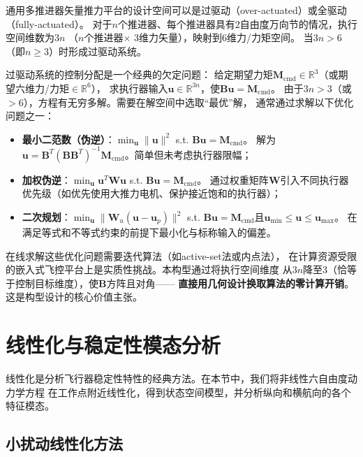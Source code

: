 \documentclass[a4paper,12pt]{ctexart}
\theoremstyle{plain}
\theoremstyle{definition}
\begin{document}
通用多推进器矢量推力平台的设计空间可以是过驱动（over-actuated）或全驱动（fully-actuated）。
对于$n$个推进器、每个推进器具有2自由度万向节的情况，执行空间维数为$3n$
（$n$个推进器$\times$ 3维力矢量），映射到6维力/力矩空间。
当$3n > 6$（即$n \ge 3$）时形成过驱动系统\cite{ding2018modeling}。

过驱动系统的控制分配是一个经典的欠定问题：
给定期望力矩$\bm{M}_{\text{cmd}} \in \mathbb{R}^3$（或期望六维力/力矩$\in \mathbb{R}^6$），
求执行器输入$\bm{u} \in \mathbb{R}^{3n}$，使$\bm{B}\bm{u} = \bm{M}_{\text{cmd}}$。
由于$3n > 3$（或$>6$），方程有无穷多解。需要在解空间中选取“最优”解，
通常通过求解以下优化问题之一\cite{johansen2013control}：
\begin{itemize}
    \item \textbf{最小二范数（伪逆）}：$\min_{\bm{u}} \|\bm{u}\|^2$ s.t. $\bm{B}\bm{u} = \bm{M}_{\text{cmd}}$。
          解为$\bm{u} = \bm{B}^T(\bm{B}\bm{B}^T)^{-1}\bm{M}_{\text{cmd}}$。简单但未考虑执行器限幅；
    \item \textbf{加权伪逆}：$\min_{\bm{u}} \bm{u}^T\bm{W}\bm{u}$ s.t. $\bm{B}\bm{u} = \bm{M}_{\text{cmd}}$。
          通过权重矩阵$\bm{W}$引入不同执行器优先级（如优先使用大推力电机、保护接近饱和的执行器）；
    \item \textbf{二次规划}：$\min_{\bm{u}} \|\bm{W}_u(\bm{u} - \bm{u}_p)\|^2$ s.t.
          $\bm{B}\bm{u} = \bm{M}_{\text{cmd}}$且$\bm{u}_{\min} \le \bm{u} \le \bm{u}_{\max}$。
          在满足等式和不等式约束的前提下最小化与标称输入的偏差。
\end{itemize}

在线求解这些优化问题需要迭代算法（如active-set法或内点法），
在计算资源受限的嵌入式飞控平台上是实质性挑战。本构型通过将执行空间维度
从$3n$降至3（恰等于控制目标维度），使$\bm{B}$方阵且对角——
\textbf{直接用几何设计换取算法的零计算开销}。这是构型设计的核心价值主张。

\section{线性化与稳定性模态分析}
\label{sec:stability}

线性化是分析飞行器稳定性特性的经典方法。在本节中，我们将非线性六自由度动力学方程
在工作点附近线性化，得到状态空间模型，并分析纵向和横航向的各个特征模态。

\subsection{小扰动线性化方法}
\end{document}
